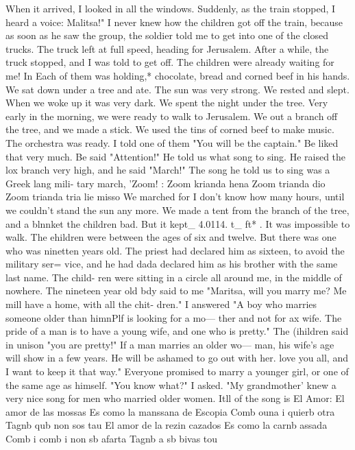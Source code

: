 When it 
arrived, I looked in all the windows.
Suddenly, as the train stopped, I heard a voice: 
Malitsa!"
I never knew how the children got off the train, because as soon as he saw the 
group, the soldier told me to get into one of the closed trucks.
The truck left at full 
speed, heading for Jerusalem.
After a while, the truck stopped, and I was told to get off.
The children were already 
waiting for me!
In Each of them was holding,* chocolate, bread and corned beef in his hands.
We sat down under a tree and ate.
The sun was very strong.
We rested and slept.
When we 
woke up it was very dark.
We spent the night under the tree.
Very early in the morning, 
we were ready to walk to Jerusalem.
We out a branch off the tree, and we made a stick.
We used the tins of corned beef to 
make music.
The orchestra was ready.
I told one of them "You will be the captain."
Be 
liked that very much.
Be said "Attention!"
He told us what song to sing.
He raised the lox 
branch very high, and he said "March!"
The song he told us to sing was a Greek lang mili-
tary march, 'Zoom!
: 
Zoom krianda hena 
Zoom trianda dio 
Zoom trianda tria 
lie misso 
We marched for I don't know how many hours, until we couldn't stand the sun any more.
We made a tent from the branch of the tree, and a blnnket the children bad.
But it kept_ 
4.0114. 
t_ ft* 
.
It was impossible to walk.
The ehildren were between the ages of six and twelve.
But there was one who was 
ninetten years old.
The priest had declared him as sixteen, to avoid the military ser= 
vice, and he had dada declared him as his brother with the same last name.
The child-
ren were sitting in a circle all around me, in the middle of nowhere.
The nineteen year 
old bdy said to me "Maritsa, will you marry me?
Me mill have a home, with all the chit- 
dren."
I answered "A boy who marries someone older than himnPlf is looking for a mo— 
ther and not for ax wife.
The pride of a man is to have a young wife, and one who is 
pretty."
The (ihildren said in unison "you are pretty!"
If a man marries an older wo— 
man, his wife's age will show in a few years.
He will be ashamed to go out with her.
love you all, and I want to keep it that way."
Everyone promised to marry a younger 
girl, or one of the same age as himself.
"You know what?"
I asked.
"My grandmother' 
knew a very nice song for men who married older women.
Itll 
of the song is El Amor: 
El amor de las mossas 
Es como la manssana de Escopia 
Comb ouna i quierb otra 
Tagnb qub non sos tau 
El amor de la rezin cazados 
Es como la carnb assada 
Comb i comb i non sb afarta 
Tagnb a sb bivas tou 
